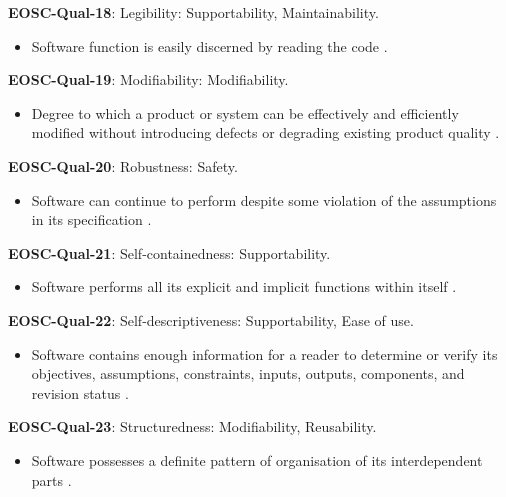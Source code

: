 \textbf{EOSC-Qual-18}: Legibility: Supportability, Maintainability.

\begin{itemize}
    \item Software function is easily discerned by reading the code \cite{boehm_quantitative_1976}.
\end{itemize}

\textbf{EOSC-Qual-19}: Modifiability: Modifiability.

\begin{itemize}
    \item Degree to which a product or system can be effectively and efficiently modified without introducing defects or degrading existing product quality \cite{iso_25010_2011_2017,boehm_quantitative_1976}.
\end{itemize}

\textbf{EOSC-Qual-20}: Robustness: Safety.

\begin{itemize}
    \item Software can continue to perform despite some violation of the assumptions in its specification \cite{boehm_quantitative_1976}.
\end{itemize}

\textbf{EOSC-Qual-21}: Self-containedness: Supportability.

\begin{itemize}
    \item Software performs all its explicit and implicit functions within itself \cite{boehm_quantitative_1976}.
\end{itemize}

\textbf{EOSC-Qual-22}: Self-descriptiveness: Supportability, Ease of use.

\begin{itemize}
    \item Software contains enough information for a reader to determine or verify its objectives, assumptions, constraints, inputs, outputs, components, and revision status \cite{boehm_quantitative_1976}.
\end{itemize}

\textbf{EOSC-Qual-23}: Structuredness: Modifiability, Reusability.

\begin{itemize}
    \item Software possesses a definite pattern of organisation of its interdependent parts \cite{boehm_quantitative_1976}.
\end{itemize}

